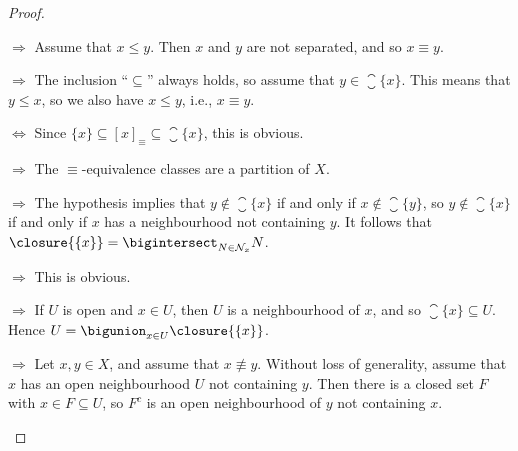 \documentclass[article, a4paper, 11pt, oneside]{memoir}
\numberwithin{equation}{chapter}
\newcommand{\calN}{\mathcal{N}}
\newcommand{\nhoodfilter}[1]{\calN_{#1}}
\renewcommand{\implies}{\Rightarrow}
\renewcommand{\iff}{\Leftrightarrow}
\begin{document}
\begin{proof}
\begin{proofsec}
    \item[\subcref{enum:R0-space} $\implies$ \subcref{enum:R0-specialisation-preorder-symmetric}]
    Assume that $x \leq y$. Then $x$ and $y$ are not separated, and so $x \equiv y$.

    \item[\subcref{enum:R0-specialisation-preorder-symmetric} $\implies$ \subcref{enum:R0-closure-of-point}]
    The inclusion \enquote{$\subseteq$} always holds, so assume that $y \in \closure{\{x\}}$. This means that $y \leq x$, so we also have $x \leq y$, i.e., $x \equiv y$.

    \item[\subcref{enum:R0-closure-of-point} $\iff$ \subcref{enum:R0-equivalence-class-closed}]
    Since $\{x\} \subseteq [x]_\equiv \subseteq \closure{\{x\}}$, this is obvious.
    
    \item[\subcref{enum:R0-closure-of-point} $\implies$ \subcref{enum:R0-partition}]
    The $\equiv$-equivalence classes are a partition of $X$.
    
    \item[\subcref{enum:R0-partition} $\implies$ \subcref{enum:R0-closure-intersection-of-nhoods}]
    The hypothesis implies that $y \not\in \closure{\{x\}}$ if and only if $x \not\in \closure{\{y\}}$, so $y \not\in \closure{\{x\}}$ if and only if $x$ has a neighbourhood not containing $y$. It follows that $\closure{\{x\}} = \bigintersect_{N \in \nhoodfilter{x}} N$.

    \item[\subcref{enum:R0-closure-intersection-of-nhoods} $\implies$ \subcref{enum:R0-nhood-contains-closure}]
    This is obvious.

    \item[\subcref{enum:R0-nhood-contains-closure} $\implies$ \subcref{enum:R0-open-union-of-closed}]
    If $U$ is open and $x \in U$, then $U$ is a neighbourhood of $x$, and so $\closure{\{x\}} \subseteq U$. Hence $U = \bigunion_{x \in U} \closure{\{x\}}$.

    \item[\subcref{enum:R0-open-union-of-closed} $\implies$ \subcref{enum:R0-space}]
    Let $x,y \in X$, and assume that $x \not\equiv y$. Without loss of generality, assume that $x$ has an open neighbourhood $U$ not containing $y$. Then there is a closed set $F$ with $x \in F \subseteq U$, so $F^c$ is an open neighbourhood of $y$ not containing $x$.
\end{proofsec}
\end{proof}
\end{document}
